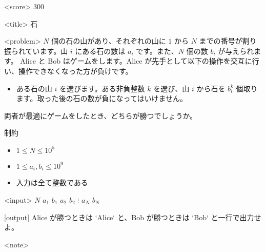 <score>
300

<title>
石

<problem>
$N$ 個の石の山があり、それぞれの山に $1$ から $N$ までの番号が割り振られています。山 $i$ にある石の数は $a_i$ です。また、$N$ 個の数 $b_i$ が与えられます。
Alice と Bob はゲームをします。Alice が先手として以下の操作を交互に行い、操作できなくなった方が負けです。

\begin{itemize}
\item ある石の山 $i$ を選びます。ある非負整数 $k$ を選び、山 $i$ から石を $b_i^k$ 個取ります。取った後の石の数が負になってはいけません。
\end{itemize}

両者が最適にゲームをしたとき、どちらが勝つでしょうか。

\Large{制約}

\begin{itemize}
    \item $1 \leq N \leq 10^5$
    \item $1 \leq a_i, b_i \leq 10^9$
    \item 入力は全て整数である
\end{itemize}

<input>
$N$
$a_1$ $b_1$
$a_2$ $b_2$
$\vdots$
$a_N$ $b_N$

[output]
Alice が勝つときは `Alice` と、Bob が勝つときは `Bob` と一行で出力せよ。

<note>
